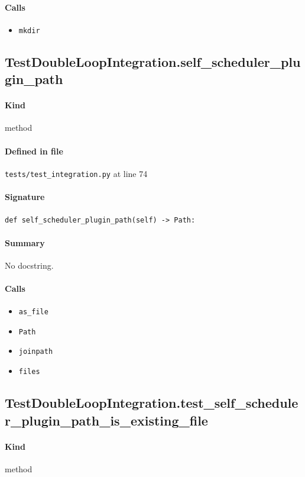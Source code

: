 \documentclass[11pt]{report}
\begin{document}
\paragraph{Calls}
\begin{itemize}[leftmargin=*]
  \item \texttt{mkdir}
\end{itemize}
\subsection{TestDoubleLoopIntegration.self\_scheduler\_plugin\_path}
\label{def:tests-test_integration.py:TestDoubleLoopIntegration.self_scheduler_plugin_path:L74}
\paragraph{Kind} method
\paragraph{Defined in file} \texttt{tests/test\_integration.py} at line 74
\paragraph{Signature} \texttt{def self\_scheduler\_plugin\_path(self) -> Path:}
\paragraph{Summary} No docstring.
\paragraph{Calls}
\begin{itemize}[leftmargin=*]
  \item \texttt{as\_file}
  \item \texttt{Path}
  \item \texttt{joinpath}
  \item \texttt{files}
\end{itemize}
\subsection{TestDoubleLoopIntegration.test\_self\_scheduler\_plugin\_path\_is\_existing\_file}
\label{def:tests-test_integration.py:TestDoubleLoopIntegration.test_self_scheduler_plugin_path_is_existing_file:L83}
\paragraph{Kind} method
\end{document}
